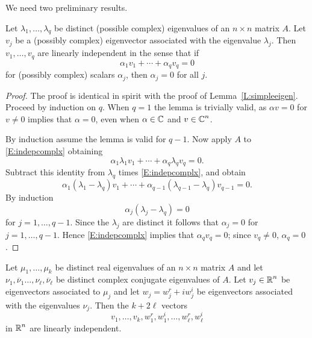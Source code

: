 \documentclass{ximera}
\begin{document}
We need two preliminary results.  
\begin{lemma} \label{L:indepcomplx}
Let $\lambda_1,\ldots,\lambda_q$ be distinct (possible complex) eigenvalues 
of an $n\times n$ matrix $A$.  Let $v_j$ be a (possibly complex)
eigenvector associated with the eigenvalue $\lambda_j$.  Then
$v_1,\ldots,v_q$ are linearly independent in the sense that if
\begin{equation}  \label{E:indepcomplx}
\alpha_1v_1 + \cdots + \alpha_qv_q = 0
\end{equation}
for (possibly complex) scalars $\alpha_j$, then $\alpha_j=0$ for all $j$.
\end{lemma}

\begin{proof}  The proof is identical in spirit with the proof of 
Lemma~\ref{L:simpleeigen}.  Proceed by induction on $q$.  When $q=1$ the
lemma is trivially valid, as $\alpha v=0$ for $v\neq 0$ implies that
$\alpha=0$, even when $\alpha\in\mbox{$\mathbb{C}$}$ and $v\in\mbox{$\mathbb{C}$}^n$.  

By induction assume the lemma is valid for $q-1$.  Now apply $A$ to 
\eqref{E:indepcomplx} obtaining
\[
\alpha_1\lambda_1v_1 + \cdots + \alpha_q\lambda_qv_q = 0.
\]
Subtract this identity from $\lambda_q$ times \eqref{E:indepcomplx}, and obtain
\[
\alpha_1(\lambda_1-\lambda_q)v_1 + \cdots +
\alpha_{q-1}(\lambda_{q-1}-\lambda_q)v_{q-1} = 0.
\]
By induction 
\[
\alpha_j(\lambda_j-\lambda_q) = 0
\]
for $j=1,\ldots, q-1$.  Since the $\lambda_j$ are distinct it follows that 
$\alpha_j=0$ for $j=1,\ldots, q-1$.  Hence \eqref{E:indepcomplx} implies that 
$\alpha_qv_q = 0$; since $v_q\neq 0$, $\alpha_q=0$.  \end{proof}

\begin{lemma}  \label{L:rlcmplx}
Let $\mu_1,\ldots,\mu_k$ be distinct real eigenvalues of an $n\times n$ 
matrix $A$ and let $\nu_1,\overline{\nu}_1\ldots,\nu_\ell,\overline{\nu}_\ell$
be distinct complex conjugate eigenvalues of $A$.  Let $v_j\in\mbox{$\mathbb{R}$}^n$ be
eigenvectors associated to $\mu_j$ and let $w_j=w_j^r+iw_j^i$ be eigenvectors
associated with the eigenvalues $\nu_j$.  Then the $k+2\ell$ vectors 
\[
v_1,\ldots,v_k,w_1^r,w_1^i,\ldots,w_\ell^r,w_\ell^i
\]
in $\mbox{$\mathbb{R}$}^n$ are linearly independent.
\end{lemma}
\end{document}
